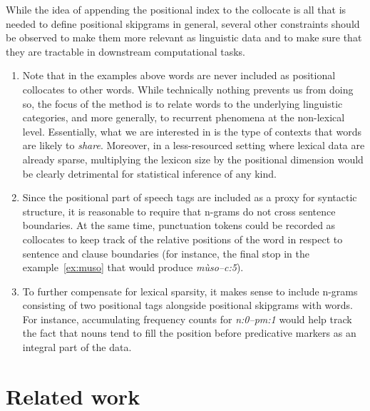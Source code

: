 \documentclass[12pt]{article}
\begin{document}
While the idea of appending the positional index to the collocate is all that
is needed to define positional skipgrams in general, several other
constraints should be observed to make them more relevant as
linguistic data and to make sure that they are tractable in
downstream computational tasks.

\begin{enumerate}
\item Note that in the examples above words are never included as
  positional collocates to other words. While technically nothing
  prevents us from doing so, the focus of the method is to relate
  words to the underlying linguistic categories, and more generally,
  to recurrent phenomena at the non-lexical level.  Essentially, what
  we are interested in is the type of contexts that words are likely
  to \textit{share}.  Moreover, in a less-resourced setting where
  lexical data are already sparse, multiplying the lexicon size by the
  positional dimension would be clearly detrimental for statistical
  inference of any kind.
\item Since the positional part of speech tags are included as a proxy
  for syntactic structure, it is reasonable to require that n-grams do
  not cross sentence boundaries.  At the same time, punctuation tokens
  could be recorded as collocates to keep track of the relative
  positions of the word in respect to sentence and clause boundaries
  (for instance, the final stop in the example~\ref{ex:muso} that would
  produce \textit{mùso--c:5}).
\item To further compensate for lexical sparsity, it makes sense to
  include n-grams consisting of two positional tags alongside
  positional skipgrams with words. For instance, accumulating
  frequency counts for \textit{n:0--pm:1} would help track the
  fact that nouns tend to fill the position before predicative
  markers as an integral part of the data.
\end{enumerate} 


\section{Related work}
\end{document}
